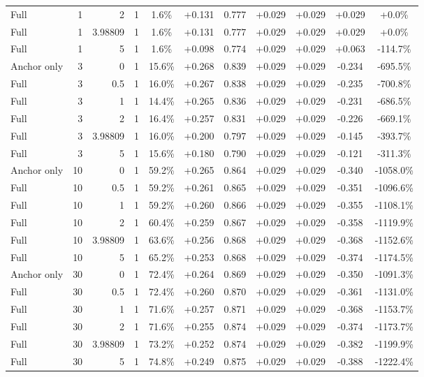 \begin{table}[htbp]
\begin{tabular}{lrrrccccccc}
Full & 1 & 2 & 1 & 1.6\% & +0.131 & 0.777 & +0.029 & +0.029 & +0.029 & +0.0\% \\
Full & 1 & 3.98809 & 1 & 1.6\% & +0.131 & 0.777 & +0.029 & +0.029 & +0.029 & +0.0\% \\
Full & 1 & 5 & 1 & 1.6\% & +0.098 & 0.774 & +0.029 & +0.029 & +0.063 & -114.7\% \\
Anchor only & 3 & 0 & 1 & 15.6\% & +0.268 & 0.839 & +0.029 & +0.029 & -0.234 & -695.5\% \\
Full & 3 & 0.5 & 1 & 16.0\% & +0.267 & 0.838 & +0.029 & +0.029 & -0.235 & -700.8\% \\
Full & 3 & 1 & 1 & 14.4\% & +0.265 & 0.836 & +0.029 & +0.029 & -0.231 & -686.5\% \\
Full & 3 & 2 & 1 & 16.4\% & +0.257 & 0.831 & +0.029 & +0.029 & -0.226 & -669.1\% \\
Full & 3 & 3.98809 & 1 & 16.0\% & +0.200 & 0.797 & +0.029 & +0.029 & -0.145 & -393.7\% \\
Full & 3 & 5 & 1 & 15.6\% & +0.180 & 0.790 & +0.029 & +0.029 & -0.121 & -311.3\% \\
Anchor only & 10 & 0 & 1 & 59.2\% & +0.265 & 0.864 & +0.029 & +0.029 & -0.340 & -1058.0\% \\
Full & 10 & 0.5 & 1 & 59.2\% & +0.261 & 0.865 & +0.029 & +0.029 & -0.351 & -1096.6\% \\
Full & 10 & 1 & 1 & 59.2\% & +0.260 & 0.866 & +0.029 & +0.029 & -0.355 & -1108.1\% \\
Full & 10 & 2 & 1 & 60.4\% & +0.259 & 0.867 & +0.029 & +0.029 & -0.358 & -1119.9\% \\
Full & 10 & 3.98809 & 1 & 63.6\% & +0.256 & 0.868 & +0.029 & +0.029 & -0.368 & -1152.6\% \\
Full & 10 & 5 & 1 & 65.2\% & +0.253 & 0.868 & +0.029 & +0.029 & -0.374 & -1174.5\% \\
Anchor only & 30 & 0 & 1 & 72.4\% & +0.264 & 0.869 & +0.029 & +0.029 & -0.350 & -1091.3\% \\
Full & 30 & 0.5 & 1 & 72.4\% & +0.260 & 0.870 & +0.029 & +0.029 & -0.361 & -1131.0\% \\
Full & 30 & 1 & 1 & 71.6\% & +0.257 & 0.871 & +0.029 & +0.029 & -0.368 & -1153.7\% \\
Full & 30 & 2 & 1 & 71.6\% & +0.255 & 0.874 & +0.029 & +0.029 & -0.374 & -1173.7\% \\
Full & 30 & 3.98809 & 1 & 73.2\% & +0.252 & 0.874 & +0.029 & +0.029 & -0.382 & -1199.9\% \\
Full & 30 & 5 & 1 & 74.8\% & +0.249 & 0.875 & +0.029 & +0.029 & -0.388 & -1222.4\% \\

\end{tabular}
\end{table}
